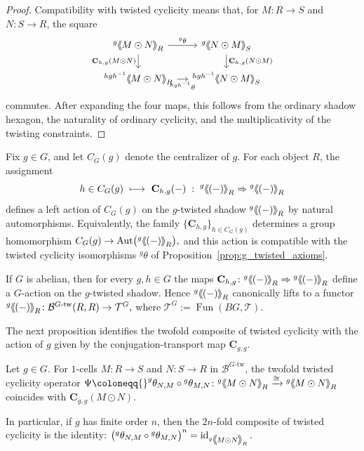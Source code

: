 \documentclass[11pt,oneside]{amsart}
\DeclareMathOperator{\id}{id}
\numberwithin{equation}{section}
\numberwithin{figure}{section}
\theoremstyle{plain}
\theoremstyle{definition}
\theoremstyle{remark}
\newcommand{\shspace}{\hspace{.5mm}} %
\newcommand{\sh}[1]{{\ensuremath{\shspace\hspace{1mm}\makebox[-1mm]{$\langle$}\makebox[0mm]{$\langle$}\hspace{1mm}{#1}\makebox[1mm]{$\rangle$}\makebox[0mm]{$\rangle$}\shspace}}}
\begin{document}
\begin{proof}
Compatibility with twisted cyclicity means that, for
\(M:R\to S\) and \(N:S\to R\), the square
\[
\begin{tikzcd}[column sep=4mm,row sep=5mm]
{}^g\sh{M\odot N}_R
  \arrow[r,"{}^g\theta"]
  \arrow[d,"\mathbf C_{h,g}(M\odot N)"']
&
{}^g\sh{N\odot M}_S
  \arrow[d,"\mathbf C_{h,g}(N\odot M)"]
\\
{}^{hgh^{-1}}\sh{M\odot N}_R
  \arrow[r,"{}^{hgh^{-1}}\theta"']
&
{}^{hgh^{-1}}\sh{N\odot M}_S
\end{tikzcd}
\]
commutes. After expanding the four maps, this follows from the
ordinary shadow hexagon, the naturality of ordinary cyclicity, and
the multiplicativity of the twisting constraints.
\end{proof}


 

 \begin{cor}\label{cor:centralizer-action}
Fix \(g\in G\), and let \(C_G(g)\) denote the centralizer of \(g\).
For each object \(R\), the assignment
\[
h\in C_G(g)\ \longmapsto\ \mathbf C_{h,g}(-)\;:\;
{}^g\sh{(-)}_R \Rightarrow {}^g\sh{(-)}_R
\]
defines a left action of \(C_G(g)\) on the \(g\)-twisted shadow
\({}^g\sh{(-)}_R\) by natural automorphisms.
Equivalently, the family \(\{\mathbf C_{h,g}\}_{h\in C_G(g)}\) determines a group homomorphism
\(
C_G(g)\to \mathrm{Aut}\bigl({}^g\sh{(-)}_R\bigr),
\)
and this action is compatible with the twisted cyclicity isomorphisms
\({}^g\theta\) of Proposition~\ref{prop:g_twisted_axioms}.
\end{cor}


 \begin{cor}\label{cor:abelian-G-action}
If \(G\) is abelian, then for every \(g,h\in G\) the maps
\(
\mathbf C_{h,g}\colon {}^g\sh{(-)}_R \Rightarrow {}^g\sh{(-)}_R
\)
define a \(G\)-action on the \(g\)-twisted shadow.
Hence \({}^g\sh{(-)}_R\) canonically lifts to a functor
\(
{}^g\sh{(-)}_R\colon \mathcal B^{G\text{-tw}}(R,R)\to \mathcal T^G,\) where
\(\mathcal T^G:=\operatorname{Fun}(BG,\mathcal T)\).
\end{cor}

 


 
The next proposition identifies the twofold composite of twisted
cyclicity with the action of \(g\) given by the conjugation-transport
map \(\mathbf C_{g,g}\).

\begin{prop}\label{prop:twisted_2n_return}
Let \(g\in G\). For \(1\)-cells
\(M\colon R\to S\) and \(N\colon S\to R\) in
\(\mathcal B^{G\text{-tw}}\), the twofold twisted cyclicity operator
\(
\Psi
\coloneqq
{}^g\theta_{N,M}\circ{}^g\theta_{M,N}
\colon
{}^g\sh{M\odot N}_R
\xrightarrow{\cong}
{}^g\sh{M\odot N}_R
\)
coincides with
\(\mathbf C_{g,g}(M\odot N)\).

In particular, if \(g\) has finite order \(n\), then the \(2n\)-fold
composite of twisted cyclicity is the identity:
\(
\bigl({}^g\theta_{N,M}\circ{}^g\theta_{M,N}\bigr)^n
=
\id_{{}^g\sh{M\odot N}_R}.
\)
\end{prop}
\end{document}
